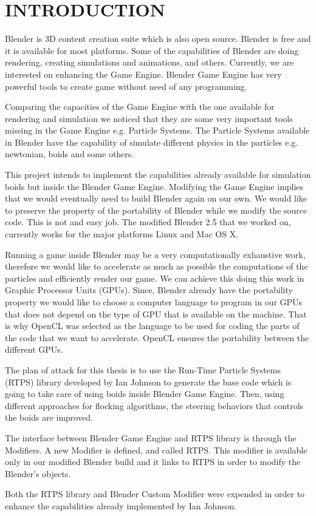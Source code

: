 \chapter{INTRODUCTION}


Blender is 3D content creation suite which is also open source. Blender is free and it is available for most platforms. Some of the capabilities of Blender are doing rendering, creating simulations and animations, and others. Currently, we are interested on enhancing the Game Engine. Blender Game Engine has very powerful tools to create game without need of any programming.  

Comparing the capacities of the Game Engine with the one available for rendering and simulation we noticed that they are some very important tools missing in the Game Engine e.g. Particle Systems. The Particle Systems available in Blender have the capability of simulate different physics in the particles e.g. newtonian, boids and some others. 

This project intends to implement the capabilities already available for simulation boids but inside the Blender Game Engine. Modifying the Game Engine implies that we would eventually need to build Blender again on our own. We would like to preserve the property of the portability of Blender while we modify the source code. This is not and easy job. The modified Blender 2.5 that we worked on, currently works for the major platforms Linux and Mac OS X.

Running a  game inside Blender may be a very computationally exhaustive work, therefore we would like to  accelerate as much as possible the computations of the particles and efficiently render our game. We can achieve this doing this work in Graphic Processor Units (GPUs). Since, Blender already have the portability property we would like to choose a computer language to program in our GPUs that does not depend on the type of GPU that is available on the machine. That is why OpenCL was selected as the language to be used for coding the parts of the code that we want to accelerate. OpenCL ensures the portability between the different GPUs.

The plan of attack for this thesis is to use the Run-Time Particle Systems (RTPS) library developed by Ian Johnson to generate the base code which is going to take care of using boids inside Blender Game Engine. Then, using different approaches for flocking algorithms, the steering behaviors that controls the boids are improved.

The interface between Blender Game Engine and RTPS library is through the Modifiers. A new Modifier is defined, and called RTPS. This modifier is available only in our modified Blender build and it links to RTPS in order to modify the Blender's objects. 

Both the RTPS library and Blender Custom Modifier were expended in order to enhance the capabilities already implemented by Ian Johnson.



